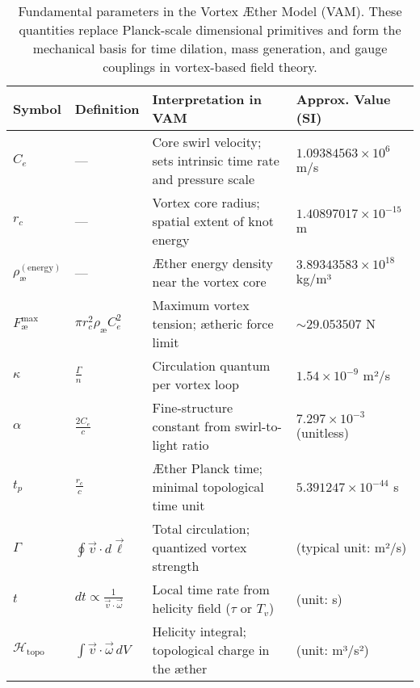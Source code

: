\begin{table}[H]
    \centering
    \scriptsize
    \renewcommand{\arraystretch}{1.3}
    \begin{tabular}{|l|l|l|l|}
        \hline
        \textbf{Symbol} & \textbf{Definition} & \textbf{Interpretation in VAM} & \textbf{Approx. Value (SI)} \\
        \hline

        $C_e$ &
        — &
        Core swirl velocity; sets intrinsic time rate and pressure scale &
        $1.09384563 \times 10^6$ m/s \\
        \hline

        $r_c$ &
        — &
        Vortex core radius; spatial extent of knot energy &
        $1.40897017 \times 10^{-15}$ m \\
        \hline

        $\rho_\text{\ae}^{(\text{energy})}$ &
        — &
        Æther energy density near the vortex core &
        $3.89343583 \times 10^{18}$ kg/m³ \\
        \hline

        $F^{\text{max}}_{\text{\ae}}$ &
        $\pi r_c^2 \rho_\text{\ae} C_e^2$ &
        Maximum vortex tension; ætheric force limit &
        $\sim 29.053507$ N \\
        \hline

        $\kappa$ &
        $\frac{\Gamma}{n}$ &
        Circulation quantum per vortex loop &
        $1.54 \times 10^{-9}$ m²/s \\
        \hline

        $\alpha$ &
        $\frac{2 C_e}{c}$ &
        Fine-structure constant from swirl-to-light ratio &
        $7.297 \times 10^{-3}$ (unitless) \\
        \hline

        $t_p$ &
        $\frac{r_c}{c}$ &
        Æther Planck time; minimal topological time unit &
        $5.391247 \times 10^{-44}$ s \\
        \hline

        $\Gamma$ &
        $\oint \vec{v} \cdot d\vec{\ell}$ &
        Total circulation; quantized vortex strength &
        (typical unit: m²/s) \\
        \hline

        $t$ &
        $dt \propto \frac{1}{\vec{v} \cdot \vec{\omega}}$ &
        Local time rate from helicity field ($\tau$ or $T_v$) &
        (unit: s) \\
        \hline

        $\mathcal{H}_\text{topo}$ &
        $\int \vec{v} \cdot \vec{\omega} \, dV$ &
        Helicity integral; topological charge in the æther &
        (unit: m³/s²) \\
        \hline
    \end{tabular}
    \caption{Fundamental parameters in the Vortex Æther Model (VAM). These quantities replace Planck-scale dimensional primitives and form the mechanical basis for time dilation, mass generation, and gauge couplings in vortex-based field theory.}
    \label{tab:VAM_master_table}
\end{table}

